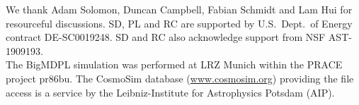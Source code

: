 \documentclass[prd,amsmath,amssymb,floatfix,superscriptaddress,nofootinbib,twocolumn]{revtex4-1}
\begin{document}
\acknowledgements
\noindent We thank Adam Solomon, Duncan Campbell, Fabian Schmidt and Lam Hui for resourceful discussions.  SD, PL and RC are supported by U.S.\ Dept.\ of Energy contract DE-SC0019248. SD and RC also acknowledge support from NSF AST-1909193.\\
The BigMDPL simulation was performed at LRZ Munich within the PRACE project pr86bu. The CosmoSim database (\url{www.cosmosim.org}) providing the file access is a service by the Leibniz-Institute for Astrophysics Potsdam (AIP).

%


\end{document}
